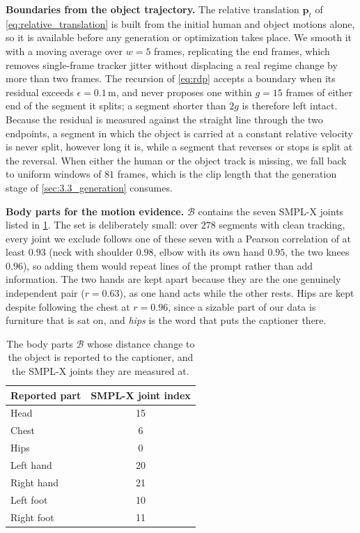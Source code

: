 \noindent\textbf{Boundaries from the object trajectory.}
The relative translation $\mathbf{p}_t$ of \cref{eq:relative_translation} is
built from the initial human and object motions alone, so it is available before
any generation or optimization takes place.  We smooth it with a moving average
over $w=5$ frames, replicating the end frames, which removes single-frame
tracker jitter without displacing a real regime change by more than two frames.
The recursion of \cref{eq:rdp} accepts a boundary when its residual exceeds
$\epsilon=0.1$\,m, and never proposes one within $g=15$ frames of either end of
the segment it splits; a segment shorter than $2g$ is therefore left intact.
Because the residual is measured against the straight line through the two
endpoints, a segment in which the object is carried at a constant relative
velocity is never split, however long it is, while a segment that reverses or
stops is split at the reversal.  When either the human or the object track is
missing, we fall back to uniform windows of $81$ frames, which is the clip
length that the generation stage of \cref{sec:3.3_generation} consumes.

\noindent\textbf{Body parts for the motion evidence.}
$\mathcal{B}$ contains the seven SMPL-X joints listed in
\cref{tab:supp_body_parts}.  The set is deliberately small: over $278$ segments
with clean tracking, every joint we exclude follows one of these seven with a
Pearson correlation of at least $0.93$ (neck with shoulder $0.98$, elbow with
its own hand $0.95$, the two knees $0.96$), so adding them would repeat lines of
the prompt rather than add information.  The two hands are kept apart because
they are the one genuinely independent pair ($r=0.63$), as one hand acts while
the other rests.  Hips are kept despite following the chest at $r=0.96$, since a
sizable part of our data is furniture that is sat on, and \textit{hips} is the
word that puts the captioner there.

\begin{table}[t]
\centering
\small
\begin{tabular}{lc}
\toprule
Reported part & SMPL-X joint index \\
\midrule
Head        & 15 \\
Chest       & 6 \\
Hips        & 0 \\
Left hand   & 20 \\
Right hand  & 21 \\
Left foot   & 10 \\
Right foot  & 11 \\
\bottomrule
\end{tabular}
\caption{The body parts $\mathcal{B}$ whose distance change to the object is
reported to the captioner, and the SMPL-X joints they are measured at.}
\label{tab:supp_body_parts}
\end{table}

